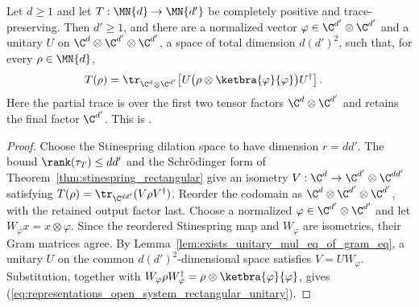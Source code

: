 \begin{theorem}
    \label{thm:channel_exists_open_system_unitary_rectangular}
    \leanok
    Let $d\geq1$ and let $T:\MN{d}\to\MN{d'}$ be completely positive and
    trace-preserving. Then $d'\geq1$, and there are a normalized vector
    $\varphi\in\C^{d'}\otimes\C^{d'}$ and a unitary $U$ on
    $\C^d\otimes\C^{d'}\otimes\C^{d'}$, a space of total dimension
    $d(d')^2$, such that, for every $\rho\in\MN{d}$,
    \begin{align}
        T(\rho)
        &=\tr_{\C^d\otimes\C^{d'}}\!\left[
          U\bigl(\rho\otimes\ketbra{\varphi}{\varphi}\bigr)U^\dagger
          \right].
        \label{eq:representations_open_system_rectangular_unitary}
    \end{align}
    Here the partial trace is over the first two tensor factors
    $\C^d\otimes\C^{d'}$ and retains the final factor $\C^{d'}$. This is
    \cite[Theorem~2.5, Equation~(2.14)]{Wolf2012Quantum}.
\end{theorem}

\begin{proof}\leanok
    Choose the Stinespring dilation space to have dimension $r=dd'$. The
    bound $\rank(\tau_T)\leq dd'$ and the Schr\"odinger form of
    Theorem~\ref{thm:stinespring_rectangular} give an isometry
    $V:\C^d\to\C^{d'}\otimes\C^{dd'}$ satisfying
    $T(\rho)=\tr_{\C^{dd'}}(V\rho V^\dagger)$. Reorder the codomain as
    $\C^d\otimes\C^{d'}\otimes\C^{d'}$, with the retained output factor
    last. Choose a normalized $\varphi\in\C^{d'}\otimes\C^{d'}$ and let
    $W_\varphi x=x\otimes\varphi$. Since the reordered Stinespring map and
    $W_\varphi$ are isometries, their Gram matrices agree. By
    Lemma~\ref{lem:exists_unitary_mul_eq_of_gram_eq}, a unitary $U$ on the
    common $d(d')^2$-dimensional space satisfies $V=UW_\varphi$. Substitution,
    together with
    $W_\varphi\rho W_\varphi^\dagger
      =\rho\otimes\ketbra{\varphi}{\varphi}$,
    gives (\ref{eq:representations_open_system_rectangular_unitary}).
\end{proof}

